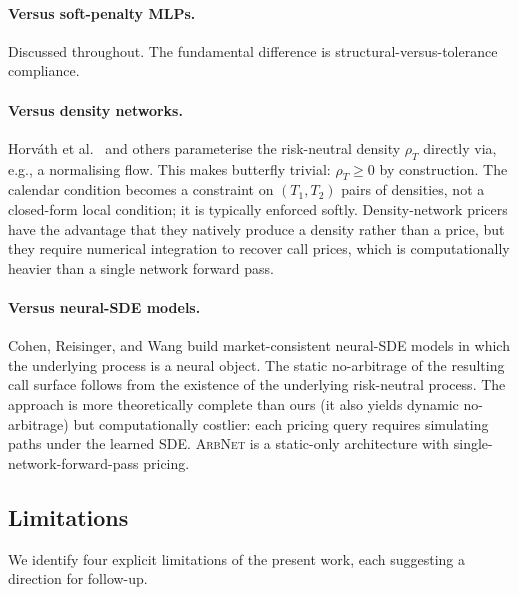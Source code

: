 \documentclass[largeformat]{interact}
\theoremstyle{plain}
\theoremstyle{definition}
\newcommand{\arbnet}{\textsc{ArbNet}}
\begin{document}
\paragraph{Versus soft-penalty MLPs.}
Discussed throughout. The fundamental difference is structural-versus-tolerance compliance.

\paragraph{Versus density networks.}
Horv\'ath et al.\ \citeyearpar{horvath2021deep} and others parameterise the risk-neutral density $\rho_T$ directly via, e.g., a normalising flow. This makes butterfly trivial: $\rho_T \geq 0$ by construction. The calendar condition becomes a constraint on $(T_1, T_2)$ pairs of densities, not a closed-form local condition; it is typically enforced softly. Density-network pricers have the advantage that they natively produce a density rather than a price, but they require numerical integration to recover call prices, which is computationally heavier than a single network forward pass.

\paragraph{Versus neural-SDE models.}
Cohen, Reisinger, and Wang \citeyearpar{cohen2023arbitrage,cohen2023nsde} build market-consistent neural-SDE models in which the underlying process is a neural object. The static no-arbitrage of the resulting call surface follows from the existence of the underlying risk-neutral process. The approach is more theoretically complete than ours (it also yields dynamic no-arbitrage) but computationally costlier: each pricing query requires simulating paths under the learned SDE. \arbnet{} is a static-only architecture with single-network-forward-pass pricing.

\subsection{Limitations}
\label{sec:limitations}

We identify four explicit limitations of the present work, each suggesting a direction for follow-up.
\end{document}

